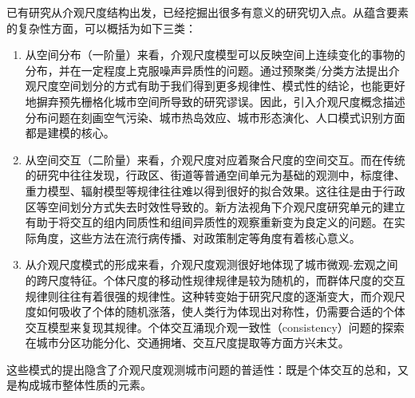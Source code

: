 
已有研究从介观尺度结构出发，已经挖掘出很多有意义的研究切入点。从蕴含要素的复杂性方面，可以概括为如下三类：\begin{enumerate}
    \item 从空间分布（一阶量）来看，介观尺度模型可以反映空间上连续变化的事物的分布，并在一定程度上克服噪声异质性的问题。通过预聚类/分类方法提出介观尺度空间划分的方式有助于我们得到更多规律性、模式性的结论，也能更好地摒弃预先栅格化城市空间所导致的研究谬误。因此，引入介观尺度概念描述分布问题在刻画空气污染\cite{mijling2012using}、城市热岛效应\cite{pi2019multi}、城市形态演化\cite{raimbault2018calibration}、人口模式识别\cite{dong2020understanding}方面都是建模的核心。
    \item 从空间交互（二阶量）来看，介观尺度对应着聚合尺度的空间交互。而在传统的研究中往往发现，行政区、街道等普通空间单元为基础的观测中，标度律、重力模型、辐射模型等规律往往难以得到很好的拟合效果\cite{jiang2011zipf, li2021gravity, mazzoli2019field}。这往往是由于行政区等空间划分方式失去时效性导致的\cite{jiang2011zipf}。新方法视角下介观尺度研究单元的建立有助于将交互的组内同质性和组间异质性的观察重新变为良定义的问题。在实际角度，这些方法在流行病传播、对政策制定等角度有着核心意义。%
    \item 从介观尺度模式的形成来看，介观尺度观测很好地体现了城市微观-宏观之间的跨尺度特征。个体尺度的移动性规律规律是较为随机的\cite{gonzalez2008understanding}，而群体尺度的交互规律则往往有着很强的规律性\cite{song2010modelling, rhee2011levy}。这种转变始于研究尺度的逐渐变大，而介观尺度如何吸收了个体的随机涨落，使人类行为体现出对称性，仍需要合适的个体交互模型来复现其规律。个体交互涌现介观一致性（consistency）问题\cite{riccardo2012towards}的探索 在城市分区功能分化、交通拥堵、交互尺度提取等方面方兴未艾。
\end{enumerate} 这些模式的提出隐含了介观尺度观测城市问题的普适性：既是个体交互的总和，又是构成城市整体性质的元素。


